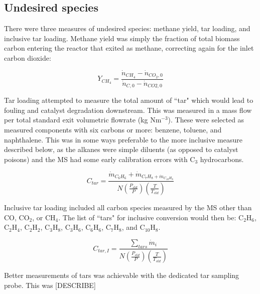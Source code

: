 \documentclass[11pt,twocolumn]{article}
\begin{document}
\subsection*{Undesired species}

There were three measures of undesired species: methane yield, tar loading, and inclusive tar loading.  Methane yield was simply the fraction of total biomass carbon entering the reactor that exited as methane, correcting again for the inlet carbon dioxide:

\begin{equation}
	Y_{CH_{4}} = \frac{\dot{n}_{CH_{4}}-\dot{n}_{CO_{2},0}}{\dot{n}_{C,0}-\dot{n}_{CO{2},0}}
\end{equation}

Tar loading attempted to measure the total amount of ``tar" which would lead to fouling and catalyst degradation downstream.  This was measured in a mass flow per total standard exit volumetric flowrate (kg Nm$^{-3}$).  These were selected as measured components with six carbons or more: benzene, toluene, and naphthalene.  This was in some ways preferable to the more inclusive measure described below, as the alkanes were simple diluents (as opposed to catalyst poisons) and the MS had some early calibration errors with C$_3$ hydrocarbons.

\begin{equation}
	C_{tar} = \frac{\dot{m}_{C_{6}H_{6}}+\dot{m}_{C_{7}H_{8}+\dot{m}_{C_{10}H_{8}}}}{N\left(\frac{P_{std}}{P}\right)\left(\frac{T}{T_{std}}\right)}
\end{equation}

Inclusive tar loading included all carbon species measured by the MS other than CO, CO$_2$, or CH$_4$.  The list of ``tars" for inclusive conversion would then be: C$_2$H$_6$, C$_2$H$_4$, C$_2$H$_2$, C$_3$H$_8$, C$_3$H$_6$, C$_6$H$_6$, C$_7$H$_8$, and C$_{10}$H$_8$.

\begin{equation}
	C_{tar,I} = \frac{\sum_{tars}\dot{m}_{i}}{N\left(\frac{P_{std}}{P}\right)\left(\frac{T}{T_{std}}\right)}
\end{equation}

Better measurements of tars was achievable with the dedicated tar sampling probe.  This was [DESCRIBE]
\end{document}
